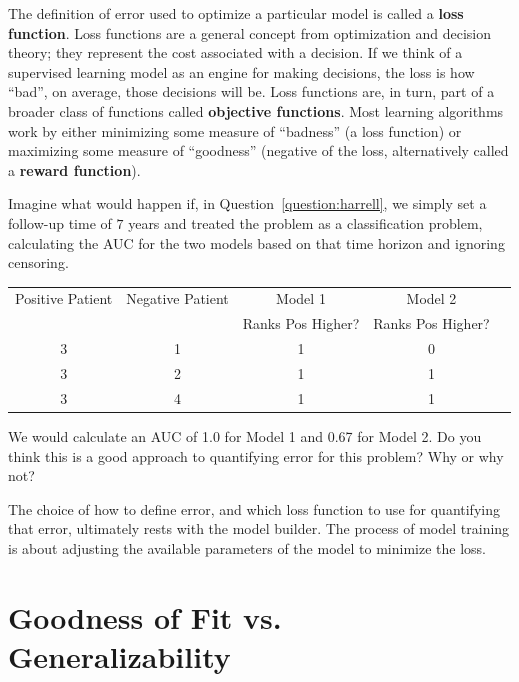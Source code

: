 The definition of error used to optimize a particular model is called a \textbf{loss function}. Loss functions are a general concept from optimization and decision theory; they represent the cost associated with a decision. If we think of a supervised learning model as an engine for making decisions, the loss is how ``bad'', on average, those decisions will be. Loss functions are, in turn, part of a broader class of functions called \textbf{objective functions}. Most learning algorithms work by either minimizing some measure of ``badness'' (a loss function) or maximizing some measure of ``goodness'' (negative of the loss, alternatively called a \textbf{reward function}).
\vspace{2mm}
\begin{question}{}
Imagine what would happen if, in Question~\ref{question:harrell}, we simply set a follow-up time of $7$ years and treated the problem as a classification problem, calculating the AUC for the two models based on that time horizon and ignoring censoring.
    \begin{center}
    \begin{tabular}{ccccc}
    \toprule
    Positive Patient & Negative Patient & Model 1 & Model 2 \\
    & & Ranks Pos Higher? & Ranks Pos Higher? \\
    \midrule
    3 & 1 & 1 & 0 \\
    3 & 2 & 1 & 1 \\
    3 & 4 & 1 & 1 \\
    \bottomrule
    \end{tabular}
    \end{center}
We would calculate an AUC of 1.0 for Model 1 and 0.67 for Model 2. Do you think this is a good approach to quantifying error for this problem? Why or why not?
\end{question}

The choice of how to define error, and which loss function to use for quantifying that error, ultimately rests with the model builder. The process of model training is about adjusting the available parameters of the model to minimize the loss. 


\section{Goodness of Fit vs. Generalizability}

